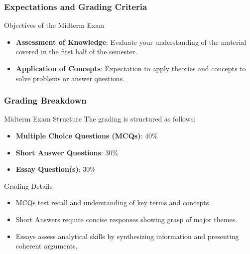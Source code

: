 \documentclass{beamer}
\begin{document}
\begin{frame}[fragile]
    \frametitle{Expectations and Grading Criteria}
    \begin{block}{Objectives of the Midterm Exam}
        \begin{itemize}
            \item \textbf{Assessment of Knowledge}: Evaluate your understanding of the material covered in the first half of the semester.
            \item \textbf{Application of Concepts}: Expectation to apply theories and concepts to solve problems or answer questions.
        \end{itemize}
    \end{block}
\end{frame}

\begin{frame}[fragile]
    \frametitle{Grading Breakdown}
    \begin{block}{Midterm Exam Structure}
        The grading is structured as follows:
        \begin{itemize}
            \item \textbf{Multiple Choice Questions (MCQs)}: 40\%
            \item \textbf{Short Answer Questions}: 30\%
            \item \textbf{Essay Question(s)}: 30\%
        \end{itemize}
    \end{block}
    \begin{block}{Grading Details}
        \begin{itemize}
            \item MCQs test recall and understanding of key terms and concepts.
            \item Short Answers require concise responses showing grasp of major themes.
            \item Essays assess analytical skills by synthesizing information and presenting coherent arguments.
        \end{itemize}
    \end{block}
\end{frame}
\end{document}
